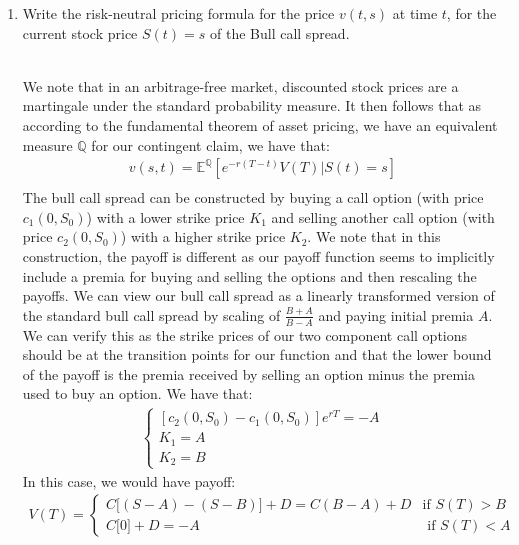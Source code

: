 \documentclass[12pt,twoside, letter]{exam}
\theoremstyle{definition}
\newcommand{\ee}{\mathbb{E}}
\begin{document}
    \begin{enumerate}
      \item Write the risk-neutral pricing formula for the price $v(t,s)$ at time $t$, for the current stock price $S(t) = s$ of the Bull call spread.
        \begin{solution}
          \\
          We note that in an arbitrage-free market, discounted stock prices are a martingale under the standard probability measure. It then follows
          that as according to the fundamental theorem of asset pricing, we have an equivalent measure $\mathbb{Q}$ for our contingent claim, we have that:
          \begin{align*}
            v(s,t) = \ee^{\mathbb{Q}}[e^{-r(T-t)}V(T) | S(t) = s] \\
          \end{align*}
            The bull call spread can be constructed by buying a call option (with price $c_1(0,S_0)$) with a lower strike price $K_1$
            and selling another call option (with price $c_2(0,S_0)$) with a higher strike price $K_2$. We note that in this construction, the payoff is different
            as our payoff function seems to implicitly include a premia for buying and selling the options and then rescaling the payoffs. We can view our
            bull call spread as a linearly transformed version of the standard bull call spread by scaling of $\frac{B+A}{B-A}$ and paying initial premia $A$.
            We can verify this as the strike prices of our two component call options should be at the transition points for our function and that
            the lower bound of the payoff is the premia received by selling an option minus the premia used to buy an option. We have that:
            \begin{align*}
              \begin{cases}
                [c_2(0,S_0) - c_1(0,S_0)]e^{rT} = -A \\
                K_1 = A \\
                K_2 = B
              \end{cases}
            \end{align*}
            In this case, we would have payoff:
            \begin{align*}
              V(T) =
              \begin{cases}
                C\big[(S-A) - (S-B)\big] + D = C(B-A)+D & \text{if $S(T) > B$} \\
                C\big[0\big] + D = -A & \text{ if $S(T) < A$}

\end{cases}
\end{align*}
\end{solution}
\end{enumerate}
\end{document}
